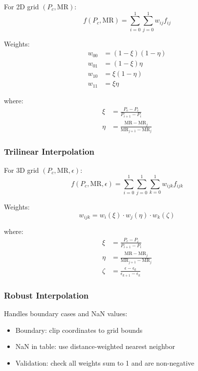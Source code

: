 \documentclass[12pt,a4paper]{article}
\newcommand{\MR}{\text{MR}}
\newcommand{\eps}{\epsilon}
\begin{document}
For 2D grid $(P_c, \MR)$:
\begin{equation}
f(P_c, \MR) = \sum_{i=0}^1 \sum_{j=0}^1 w_{ij} f_{ij}
\end{equation}

Weights:
\begin{align}
w_{00} &= (1-\xi)(1-\eta) \\
w_{01} &= (1-\xi)\eta \\
w_{10} &= \xi(1-\eta) \\
w_{11} &= \xi\eta
\end{align}

where:
\begin{align}
\xi &= \frac{P_c - P_i}{P_{i+1} - P_i} \\
\eta &= \frac{\MR - \MR_j}{\MR_{j+1} - \MR_j}
\end{align}

\subsubsection{Trilinear Interpolation}

For 3D grid $(P_c, \MR, \eps)$:
\begin{equation}
f(P_c, \MR, \eps) = \sum_{i=0}^1 \sum_{j=0}^1 \sum_{k=0}^1 w_{ijk} f_{ijk}
\end{equation}

Weights:
\begin{equation}
w_{ijk} = w_i(\xi) \cdot w_j(\eta) \cdot w_k(\zeta)
\end{equation}

where:
\begin{align}
\xi &= \frac{P_c - P_i}{P_{i+1} - P_i} \\
\eta &= \frac{\MR - \MR_j}{\MR_{j+1} - \MR_j} \\
\zeta &= \frac{\eps - \eps_k}{\eps_{k+1} - \eps_k}
\end{align}

\subsubsection{Robust Interpolation}

Handles boundary cases and NaN values:
\begin{itemize}
    \item Boundary: clip coordinates to grid bounds
    \item NaN in table: use distance-weighted nearest neighbor
    \item Validation: check all weights sum to 1 and are non-negative
\end{itemize}
\end{document}
